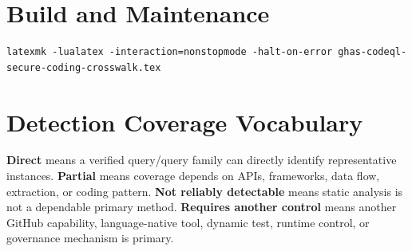 \documentclass[10pt,letterpaper]{article}
\begin{document}
\appendix
\section{Build and Maintenance}
\begin{lstlisting}
latexmk -lualatex -interaction=nonstopmode -halt-on-error ghas-codeql-secure-coding-crosswalk.tex
\end{lstlisting}
\section{Detection Coverage Vocabulary}
\textbf{Direct} means a verified query/query family can directly identify representative instances. \textbf{Partial} means coverage depends on APIs, frameworks, data flow, extraction, or coding pattern. \textbf{Not reliably detectable} means static analysis is not a dependable primary method. \textbf{Requires another control} means another GitHub capability, language-native tool, dynamic test, runtime control, or governance mechanism is primary.
\end{document}

